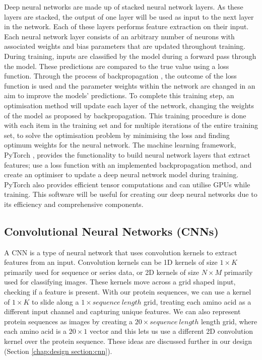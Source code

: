 \documentclass{l4proj}
\begin{document}
Deep neural networks are made up of stacked neural network layers. As these layers are stacked, the output of one layer will be used as input to the next layer in the network. Each of these layers performs feature extraction on their input. Each neural network layer consists of an arbitrary number of neurons with associated weights and bias parameters that are updated throughout training. During training, inputs are classified by the model during a forward pass through the model. These predictions are compared to the true value using a loss function. Through the process of backpropagation \citep{Goodfellow-et-al-2016}, the outcome of the loss function is used and the parameter weights within the network are changed in an aim to improve the models' predictions. To complete this training step, an optimisation method will update each layer of the network, changing the weights of the model as proposed by backpropagation. This training procedure is done with each item in the training set and for multiple iterations of the entire training set, to solve the optimisation problem by minimising the loss and finding optimum weights for the neural network. The machine learning framework, PyTorch \citep{pytorch}, provides the functionality to build neural network layers that extract features; use a loss function with an implemented backpropagation method, and create an optimiser to update a deep neural network model during training. PyTorch also provides efficient tensor computations and can utilise GPUs while training. This software will be useful for creating our deep neural networks due to its efficiency and comprehensive components.

\subsection{Convolutional Neural Networks (CNNs)}
\label{chap:background sec:CNN}

A CNN is a type of neural network that uses convolution kernels to extract features from an input. Convolution kernels can be 1D kernels of size $1\times K$ primarily used for sequence or series data, or 2D kernels of size $N\times M$ primarily used for classifying images. These kernels move across a grid shaped input, checking if a feature is present. With our protein sequences, we can use a kernel of $1\times K$ to slide along a $1\times sequence\ length$ grid, treating each amino acid as a different input channel and capturing unique features. We can also represent protein sequences as images by creating a $20\times sequence\ length$ length grid, where each amino acid is a $20\times 1$ vector and this lets us use a different 2D convolution kernel over the protein sequence. These ideas are discussed further in our design (Section \ref{chap:design section:cnn}).
\end{document}
